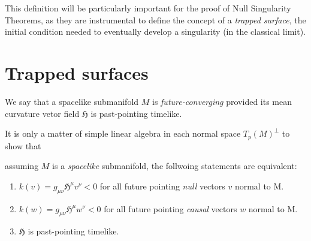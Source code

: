 This definition will be particularly important for the proof of Null Singularity Theorems, as they are instrumental to define the concept of a \emph{trapped surface}, the initial condition needed to eventually develop a singularity (in the classical limit). 

\section{Trapped surfaces}


\begin{definition}
	We say that a spacelike submanifold \(M\) is \emph{future-converging} provided its mean curvature vetor field \(\mathfrak{H}\) is past-pointing timelike.
\end{definition}



It is only a matter of simple linear algebra in each normal space \(T_p(M)^{\perp}\) to show that
\begin{lemma} \label{lemma:charact-trapped}
	assuming \(M\) is a \emph{spacelike} submanifold, the follwoing statements are equivalent:
	\begin{enumerate}
		\item  \(k(v) =g_{\mu\nu}\mathfrak{H}^{\mu} v^{\nu} < 0 \) for all future pointing \emph{null} vectors \(v\) normal to M.
		\item  \(k(w) =g_{\mu\nu}\mathfrak{H}^{\mu} w^{\nu} < 0 \) for all future pointing \emph{causal} vectors \(w\) normal to M.
		\item \(\mathfrak{H}\) is past-pointing timelike.
	\end{enumerate}
\end{lemma}

